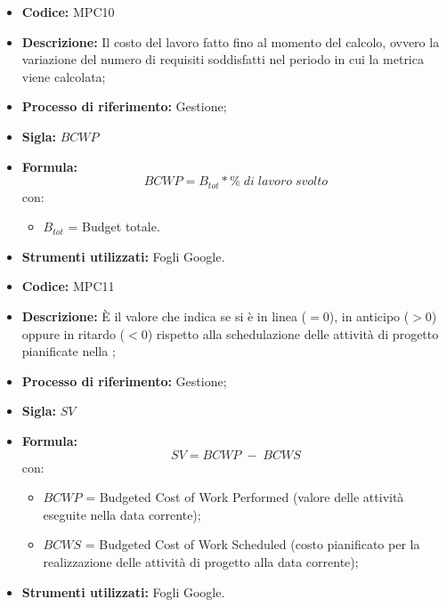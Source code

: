 \begin{itemize}
	\item \textbf{Codice:} MPC10
	\item \textbf{Descrizione:} Il costo del lavoro fatto fino al momento del calcolo, ovvero la variazione del numero di requisiti soddisfatti nel periodo in cui la metrica viene calcolata;
	\item \textbf{Processo di riferimento:} Gestione;
	\item \textbf{Sigla:} $BCWP$
	\item \textbf{Formula:} $$BCWP = {B_{tot} * \% \;di\; lavoro\; svolto}$$
	con:
	\begin{itemize}
		\item $B_{tot}$ = Budget totale.
	\end{itemize}
	\item \textbf{Strumenti utilizzati:} Fogli Google.
\end{itemize}

    \begin{itemize}
        \item \textbf{Codice:} MPC11
        \item \textbf{Descrizione:} È il valore che indica se si è in linea ($=0$), in anticipo ($>0$) oppure in ritardo ($<0$) rispetto alla schedulazione delle attività di progetto pianificate nella ;
        \item \textbf{Processo di riferimento:} Gestione;
        \item \textbf{Sigla:} $SV$
        \item \textbf{Formula:} $$SV = {BCWP \; - \; BCWS}$$
        con:
        \begin{itemize}
            \item $BCWP$ = Budgeted Cost of Work Performed (valore delle attività eseguite nella data corrente);
            \item $BCWS$ = Budgeted Cost of Work Scheduled (costo pianificato per la realizzazione delle attività di progetto alla data corrente);
        \end{itemize}
    \item \textbf{Strumenti utilizzati:} Fogli Google.
    \end{itemize}

